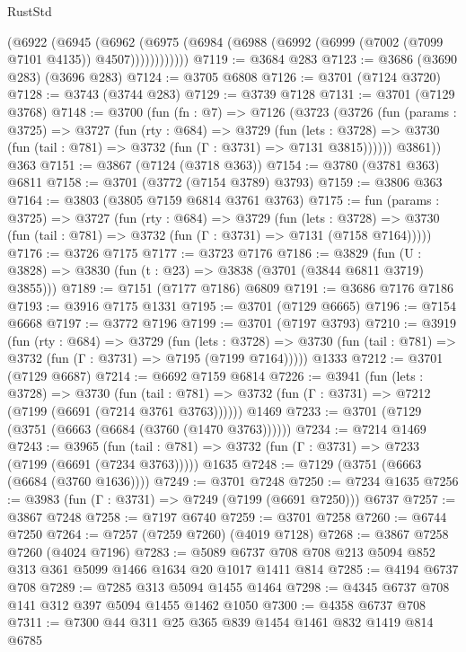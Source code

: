 \begin{lexlean}{RustStd}
\begin{coremodule}
{\begin{coremodule}
{{{{{{{{{{{{{{            (@6922
              (@6945
                (@6962
                  (@6975 (@6984 (@6988 (@6992 (@6999 (@7002 (@7099 @7101 @4135)) @4507))))))))))))
@7119 := @3684 @283
@7123 := @3686 (@3690 @283) (@3696 @283)
@7124 := @3705 @6808
@7126 := @3701 (@7124 @3720)
@7128 := @3743 (@3744 @283)
@7129 := @3739 @7128
@7131 := @3701 (@7129 @3768)
@7148 := @3700
    (fun (fn : @7) =>
    @7126
      (@3723
        (@3726
          (fun (params : @3725) =>
          @3727
            (fun (rty : @684) =>
            @3729
              (fun (lets : @3728) =>
              @3730 (fun (tail : @781) => @3732 (fun (Γ : @3731) => @7131 @3815))))))
        @3861))
    @363
@7151 := @3867 (@7124 (@3718 @363))
@7154 := @3780 (@3781 @363) @6811
@7158 := @3701 (@3772 (@7154 @3789) @3793)
@7159 := @3806 @363
@7164 := @3803 (@3805 @7159 @6814 @3761 @3763)
@7175 := fun (params : @3725) =>
  @3727
    (fun (rty : @684) =>
    @3729
      (fun (lets : @3728) =>
      @3730 (fun (tail : @781) => @3732 (fun (Γ : @3731) => @7131 (@7158 @7164)))))
@7176 := @3726 @7175
@7177 := @3723 @7176
@7186 := @3829 (fun (U : @3828) => @3830 (fun (t : @23) => @3838 (@3701 (@3844 @6811 @3719) @3855)))
@7189 := @7151 (@7177 @7186) @6809
@7191 := @3686 @7176 @7186
@7193 := @3916 @7175 @1331
@7195 := @3701 (@7129 @6665)
@7196 := @7154 @6668
@7197 := @3772 @7196
@7199 := @3701 (@7197 @3793)
@7210 := @3919
    (fun (rty : @684) =>
    @3729
      (fun (lets : @3728) =>
      @3730 (fun (tail : @781) => @3732 (fun (Γ : @3731) => @7195 (@7199 @7164)))))
    @1333
@7212 := @3701 (@7129 @6687)
@7214 := @6692 @7159 @6814
@7226 := @3941
    (fun (lets : @3728) =>
    @3730
      (fun (tail : @781) => @3732 (fun (Γ : @3731) => @7212 (@7199 (@6691 (@7214 @3761 @3763))))))
    @1469
@7233 := @3701 (@7129 (@3751 (@6663 (@6684 (@3760 (@1470 @3763))))))
@7234 := @7214 @1469
@7243 := @3965
    (fun (tail : @781) => @3732 (fun (Γ : @3731) => @7233 (@7199 (@6691 (@7234 @3763)))))
    @1635
@7248 := @7129 (@3751 (@6663 (@6684 (@3760 @1636))))
@7249 := @3701 @7248
@7250 := @7234 @1635
@7256 := @3983 (fun (Γ : @3731) => @7249 (@7199 (@6691 @7250))) @6737
@7257 := @3867 @7248
@7258 := @7197 @6740
@7259 := @3701 @7258
@7260 := @6744 @7250
@7264 := @7257 (@7259 @7260) (@4019 @7128)
@7268 := @3867 @7258 @7260 (@4024 @7196)
@7283 := @5089 @6737 @708 @708 @213 @5094 @852 @313 @361 @5099 @1466 @1634 @20 @1017 @1411 @814
@7285 := @4194 @6737 @708
@7289 := @7285 @313 @5094 @1455 @1464
@7298 := @4345 @6737 @708 @141 @312 @397 @5094 @1455 @1462 @1050
@7300 := @4358 @6737 @708
@7311 := @7300 @44 @311 @25 @365 @839 @1454 @1461 @832 @1419 @814 @6785
}}}}}}}}}}}}}}
\end{coremodule}}
\end{coremodule}
\end{lexlean}
